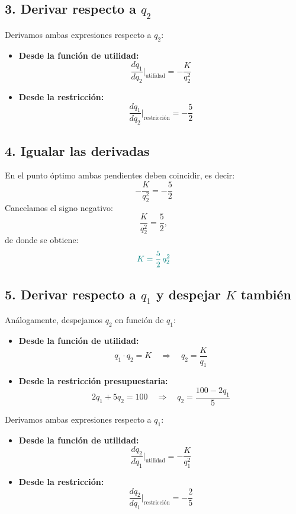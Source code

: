 \documentclass{article}
\begin{document}
\subsection*{3. Derivar respecto a \(q_2\)}
Derivamos ambas expresiones respecto a \(q_2\):

\begin{itemize}
    \item \textbf{Desde la función de utilidad:}
    \[
    \frac{dq_1}{dq_2}\Big|_{\text{utilidad}} = -\frac{K}{q_2^2}
    \]
    \item \textbf{Desde la restricción:}
    \[
    \frac{dq_1}{dq_2}\Big|_{\text{restricción}} = -\frac{5}{2}
    \]
\end{itemize}

\subsection*{4. Igualar las derivadas}
En el punto óptimo ambas pendientes deben coincidir, es decir:
\[
-\frac{K}{q_2^2} = -\frac{5}{2}
\]
Cancelamos el signo negativo:
\[
\frac{K}{q_2^2} = \frac{5}{2},
\]
de donde se obtiene:
\[ \color{teal}
K = \frac{5}{2}\,q_2^2
\]


\subsection*{5. Derivar respecto a \(q_1\) y despejar \(K\) también}

Análogamente, despejamos \(q_2\) en función de \(q_1\):

\begin{itemize}
    \item \textbf{Desde la función de utilidad:}
    \[
    q_1 \cdot q_2 = K \quad \Longrightarrow \quad q_2 = \frac{K}{q_1}
    \]
    \item \textbf{Desde la restricción presupuestaria:}
    \[
    2q_1 + 5q_2 = 100 \quad \Longrightarrow \quad q_2 = \frac{100 - 2q_1}{5}
    \]
\end{itemize}

Derivamos ambas expresiones respecto a \(q_1\):

\begin{itemize}
    \item \textbf{Desde la función de utilidad:}
    \[
    \frac{dq_2}{dq_1}\Big|_{\text{utilidad}} = -\frac{K}{q_1^2}
    \]
    \item \textbf{Desde la restricción:}
    \[
    \frac{dq_2}{dq_1}\Big|_{\text{restricción}} = -\frac{2}{5}
    \]
\end{itemize}
\end{document}
